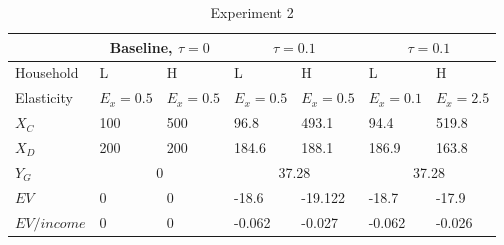 \begin{table}[]
\caption{Experiment 2}
\centering
\begin{tabular}{lllllll}
            & \multicolumn{2}{c}{Baseline, $\tau=0$} & \multicolumn{2}{c}{$\tau=0.1$}& \multicolumn{2}{c}{$\tau=0.1$} \\ \hline
Household   & L                  & H                 & L              & H            & L              & H             \\ \hline
Elasticity  & $E_x=0.5$          & $E_x=0.5$         & $E_x=0.5$      & $E_x=0.5$    & $E_x=0.1$      & $E_x=2.5$     \\
$X_C$       & 100                & 500               & 96.8           & 493.1        & 94.4           & 519.8         \\
$X_D$       & 200                & 200               & 184.6          & 188.1        & 186.9          & 163.8         \\ \hline
$Y_G$       & \multicolumn{2}{c}{0}                  & \multicolumn{2}{c}{37.28}     & \multicolumn{2}{c}{37.28}      \\ \hline
$EV$        & 0                  & 0                 & -18.6          & -19.122      & -18.7          & -17.9       \\
$EV/income$ & 0                  & 0                 & -0.062         & -0.027       & -0.062         & -0.026      
\end{tabular}
\end{table}



